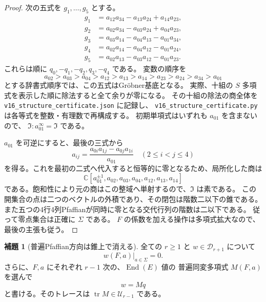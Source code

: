 \documentclass[a4paper,11pt]{ltjsarticle}
\theoremstyle{definition}
\newtheorem{lemma}[theorem]{補題}
\begin{document}
\begin{proof}
次の五式を $g_1,\ldots,g_5$ とする。
\[
\begin{split}
 g_1&=a_{12}a_{34}-a_{13}a_{24}+a_{14}a_{23},\\
 g_2&=a_{02}a_{34}-a_{03}a_{24}+a_{04}a_{23},\\
 g_3&=a_{03}a_{14}-a_{04}a_{13}-a_{01}a_{34},\\
 g_4&=a_{02}a_{14}-a_{04}a_{12}-a_{01}a_{24},\\
 g_5&=a_{02}a_{13}-a_{03}a_{12}-a_{01}a_{23}.
\end{split}
\]
これらは順に $q_0,-q_1,-q_2,q_3,-q_4$ である。
変数の順序を
\[
 a_{02}>a_{03}>a_{04}>a_{12}>a_{13}>a_{14}>
 a_{23}>a_{24}>a_{34}>a_{01}
\]
とする辞書式順序では、この五式はGr\"obner基底となる。
実際、十組の $S$ 多項式を表示した順に除法すると全て余りが零になる。
その十組の除法の商全体を
\nolinkurl{v16_structure_certificate.json} に記録し、
\nolinkurl{v16_structure_certificate.py} は各等式を整数・有理数で再構成する。
初期単項式はいずれも $a_{01}$ を含まないので、
$\mathfrak I:a_{01}^{\infty}=\mathfrak I$ である。

$a_{01}$ を可逆にすると、最後の三式から
\[
 a_{ij}=\frac{a_{0i}a_{1j}-a_{0j}a_{1i}}{a_{01}}
 \quad(2\le i<j\le4)
\]
を得る。これを最初の二式へ代入すると恒等的に零となるため、局所化した商は
\[
 \mathbb C[a_{01}^{\pm1},a_{02},a_{03},a_{04},a_{12},a_{13},a_{14}]
\]
である。飽和性により元の商はこの整域へ単射するので、$\mathfrak I$ は素である。
この開集合の点は二つのベクトルの外積であり、その閉包は階数二以下の錐である。
また五つの4行4列Pfaffianが同時に零となる交代行列の階数は二以下である。
従って零点集合は正確に $\Sigma$ である。
$F$ の係数を加える操作は多項式拡大なので、最後の主張も従う。
\end{proof}

\begin{lemma}[普遍Pfaffian方向は錐上で消える]
\label{lem:v16-plucker-vanishing-D}
全ての $r\ge1$ と $w\in\mathcal D_{r+1}$ について
\[
 w(F,a)|_{a\in\Sigma}=0.
\]
さらに、$F,a$ にそれぞれ $r-1$ 次の、$\operatorname{End}(E)$ 値の
普遍同変多項式 $M(F,a)$ を選んで
\begin{equation}\label{eq:v16-equivariant-Mq}
 w=Mq
\end{equation}
と書ける。そのトレースは $\operatorname{tr}M\in\mathcal U_{r-1}$ である。
\end{lemma}
\end{document}
